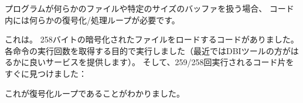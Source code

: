 
プログラムが何らかのファイルや特定のサイズのバッファを扱う場合、
コード内には何らかの復号化/処理ループが必要です。

これは。
258バイトの暗号化されたファイルをロードするコードがありました。
各命令の実行回数を取得する目的で実行しました（最近では\ac{DBI}ツールの方がはるかに良いサービスを提供します）。
そして、259/258回実行されるコード片をすぐに見つけました：



これが復号化ループであることがわかりました。